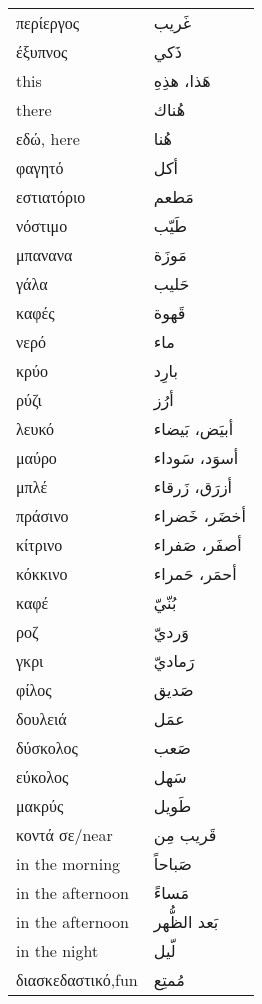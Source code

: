 \documentclass[twocolumn,a4paper]{article}
\newcommand{\ar}[1]{\textarabic{#1}}
\newcommand{\abnormalfem}{\raisebox{0.15ex}{\footnotesize ◎}}
\begin{document}
\begin{mpsupertabular}{ P{0.5\textwidth} P{0.5\textwidth} }
περίεργος   & \ar{ غَريب } \\
έξυπνος     & \ar{ ذَكي } \\
this        & \ar{ هَذا، هذِهِ } \\
there       & \ar{ هُناك } \\
εδώ, here   & \ar{هُنا } \\
φαγητό      & \ar{ أكل } \\
εστιατόριο  & \ar{ مَطعم } \\
νόστιμο     & \ar{ طَيّب } \\
μπανανα     & \ar{ مَوزَة } \\
γάλα        & \ar{ حَليب } \\
καφές       & \ar{ قَهوة } \\
νερό        & \ar{ ماء } \\
κρύο        & \ar{ بارِد } \\
ρύζι        & \ar{ أرُز } \\
λευκό   \abnormalfem      & \ar{ أبيَض، بَيضاء } \\
μαύρο   \abnormalfem      & \ar{ أسوَد، سَوداء } \\
μπλέ    \abnormalfem      & \ar{ أزرَق، زَرقاء } \\
πράσινο \abnormalfem      & \ar{ أخضَر، خَضراء } \\
κίτρινο \abnormalfem      & \ar{ أصفَر، صَفراء } \\
κόκκινο \abnormalfem      & \ar{ أحمَر، حَمراء } \\
καφέ                      & \ar{ بُنّيّ } \\
ροζ                       & \ar{ وَرديّ } \\
γκρι                      & \ar{ رَماديّ } \\
φίλος          & \ar{ صَديق } \\
δουλειά        & \ar{ عمَل } \\
δύσκολος       & \ar{ صَعب } \\
εύκολος        & \ar{ سَهل } \\
μακρύς         & \ar{ طَويل } \\
κοντά σε/near  & \ar{ قَريب مِن } \\
in the morning   & \ar{ صَباحاً } \\
in the afternoon & \ar{ مَساءً } \\
in the afternoon & \ar{ بَعد الظُّهر } \\
in the night     & \ar{ لّيل } \\
διασκεδαστικό,fun     & \ar{ مُمتِع } \\

\end{mpsupertabular}
\end{document}

